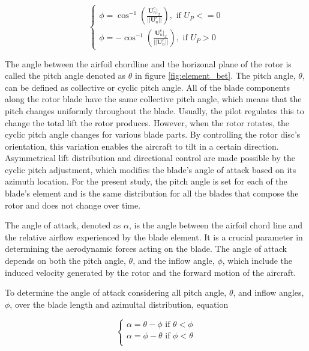 \begin{equation}
    \begin{cases}
        \phi = \cos^{-1} \left( \frac{\mathbf{U}_n^e|_x}{||\mathbf{U}_n^e||}\right), \text{ if } U_P <= 0\\
        \phi = - \cos^{-1} \left( \frac{\mathbf{U}_n^e|_x}{||\mathbf{U}_n^e||}\right), \text{ if } U_P > 0
    \end{cases}
    \label{eq:cosine_inflow_corrected}
\end{equation}

The angle between the airfoil chordline and the horizonal plane of the rotor is called the pitch angle denoted as $\theta$ in figure \ref{fig:element_bet}. The pitch angle, $\theta$, can be defined as collective or cyclic pitch angle. All of the blade components along the rotor blade have the same collective pitch angle, which means that the pitch changes uniformly throughout the blade. Usually, the pilot regulates this to change the total lift the rotor produces. However, when the rotor rotates, the cyclic pitch angle changes for various blade parts. By controlling the rotor disc's orientation, this variation enables the aircraft to tilt in a certain direction. Asymmetrical lift distribution and directional control are made possible by the cyclic pitch adjustment, which modifies the blade's angle of attack based on its azimuth location. For the present study, the pitch angle is set for each of the blade's element and is the same distribution for all the blades that compose the rotor and does not change over time. 

The angle of attack, denoted as $\alpha$, is the angle between the airfoil chord line and the relative airflow experienced by the blade element. It is a crucial parameter in determining the aerodynamic forces acting on the blade. The angle of attack depends on both the pitch angle,  $\theta$, and the inflow angle, $\phi$, which include the induced velocity generated by the rotor and the forward motion of the aircraft. 

To determine the angle of attack considering all pitch angle, $\theta$, and inflow angles, $\phi$, over the blade length and azimultal distribution, equation 

\begin{equation}
    \begin{cases}
        \alpha = \theta - \phi \text{ if } \theta < \phi\\
        \alpha = \phi - \theta \text{ if } \phi < \theta\\
    \end{cases}
    \label{eq:angle_of_attack}
\end{equation}

